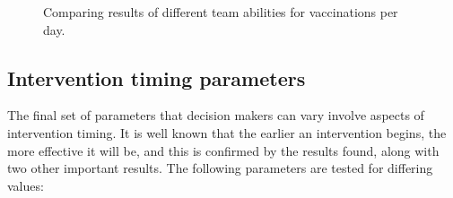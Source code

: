 \begin{itemize}
    \begin{figure}[ht!]{\textwidth}
    \centering
     \vspace{2}
    \caption{Comparing results of different team abilities for vaccinations per day.}
    \end{figure}
    
\end{itemize}

\subsection{Intervention timing parameters}
The final set of parameters that decision makers can vary involve aspects of intervention timing. It is well known that the earlier an intervention begins, the more effective it will be, and this is confirmed by the results found, along with two other important results. The following parameters are tested for differing values:

